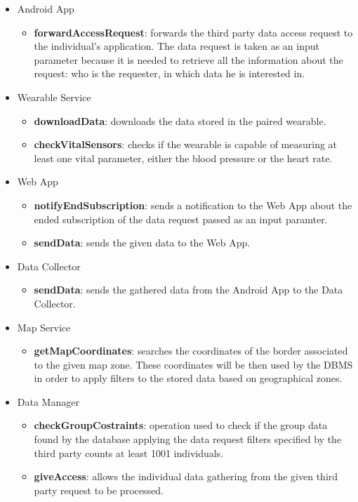 \begin{itemize}
\item Android App
\begin{itemize}
\item \textbf{forwardAccessRequest}: forwards the third party data access request to the individual's application. The data request is taken as an input parameter because it is needed to retrieve all the information about the request: who is the requester, in which data he is interested in.
\end{itemize}
\item Wearable Service
\begin{itemize}
\item \textbf{downloadData}: downloads the data stored in the paired wearable.
\item \textbf{checkVitalSensors}: checks if the wearable is capable of measuring at least one vital parameter, either the blood pressure or the heart rate.
\end{itemize}
\item Web App
\begin{itemize}
\item \textbf{notifyEndSubscription}: sends a notification to the Web App about the ended subscription of the data request passed as an input paramter.
\item \textbf{sendData}: sends the given data to the Web App.
\end{itemize}
\item Data Collector
\begin{itemize}
\item \textbf{sendData}: sends the gathered data from the Android App to the Data Collector.
\end{itemize}
\item Map Service
\begin{itemize}
\item \textbf{getMapCoordinates}: searches the coordinates of the border associated to the given map zone. These coordinates will be then used by the DBMS in order to apply filters to the stored data based on geographical zones.
\end{itemize}
\item Data Manager
\begin{itemize}
\item \textbf{checkGroupCostraints}: operation used to check if the group data found by the database applying the data request filters specified by the third party counts at least 1001 individuals.
\item \textbf{giveAccess}: allows the individual data gathering from the given third party request to be processed.

\end{itemize}
\end{itemize}

